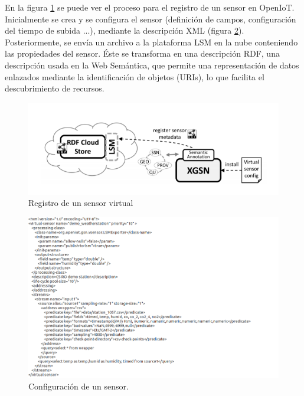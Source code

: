 \documentclass[12pt, twoside]{book}
\begin{document}
En la figura \ref{L403} se puede ver el proceso para el registro de un sensor en OpenIoT. Inicialmente se crea y se configura el sensor (definición de campos, configuración del tiempo de subida ...), mediante la descripción XML (figura \ref{L404}). Posteriormente, se envía un archivo a la plataforma LSM en la nube conteniendo las propiedades del sensor. Éste se transforma en una descripción RDF, una descripción usada en la Web Semántica, que permite una representación de datos enlazados mediante la identificación de objetos (URIs), lo que facilita el descubrimiento de recursos.
\begin{figure}[H]
\centering
\includegraphics[scale=0.4]{images/registration_capture}
\caption{Registro de un sensor virtual}\label{L403}
\end{figure}
\begin{figure}[H]
\centering
\includegraphics[scale=0.5]{images/configuration_capture}
\caption{Configuración de un sensor.}\label{L404}
\end{figure}
\end{document}
